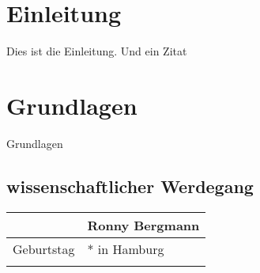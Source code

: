 \documentclass[
cleardoublepage=empty,	%
fontsize=11pt,			%
a4paper,				%
toc=bibliography,		%
listof=leveldown,		%
twoside,				%
BCOR=13mm,				%
headinclude=true,		%
footinclude=false,		%
parskip=half,			%
DIV=10					%
]{scrbook}				%
\newcommand{\UzLAutor}{Ronny Bergmann} 	%
\newcommand{\UzLGeburtsort}{Hamburg} %
\theoremstyle{normalstyle}
\begin{document}
	\chapter{Einleitung}
	Dies ist die Einleitung. Und ein Zitat~\citep{TestEntry}
	\chapter{Grundlagen}
	Grundlagen
	
	
	\begingroup
		\let\chapter=\section
		\listoffigures %
		\lstlistoflistings %
		\listoftables %
	\endgroup
	\appendix
	\backmatter
		\cleardoublepage
		\chapter*{wissenschaftlicher Werdegang} %
		\begin{tabular}{rl}\toprule
			& \UzLAutor\\\midrule
			Geburtstag  & * in \UzLGeburtsort\\
			\\\bottomrule
		\end{tabular}
\end{document}
